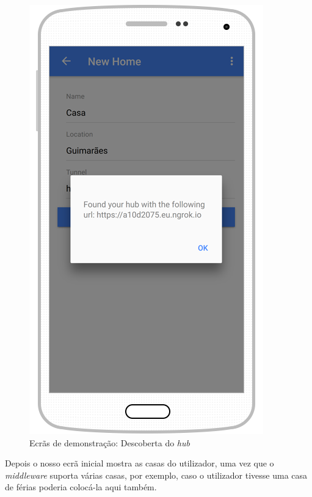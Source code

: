 \begin{figure}[H]
  \centering
        \includegraphics[scale=0.6]{img/demo/create_home_find_hub.png}
  \caption{Ecrãs de demonstração: Descoberta do \textit{hub}}
\end{figure}

Depois o nosso ecrã inicial mostra as casas do utilizador, uma vez que o \textit{middleware} suporta várias casas, por exemplo, caso o utilizador tivesse uma casa de férias poderia colocá-la aqui também.

